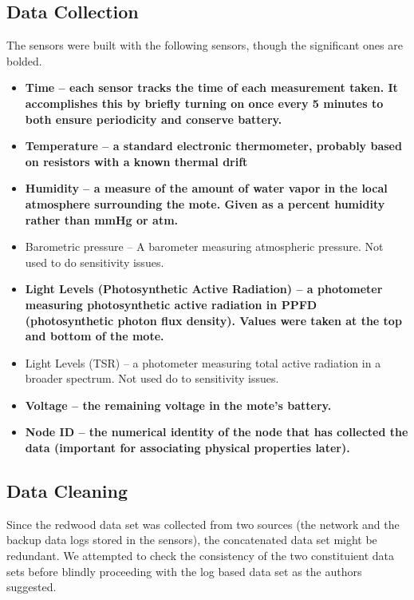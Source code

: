 \documentclass[english]{article}\usepackage[]{graphicx}\usepackage[]{color}
\begin{document}
\subsection{Data Collection}
The sensors were built with the following sensors, though the significant ones are bolded.
\begin{itemize}
\item \textbf{Time -- each sensor tracks the time of each measurement taken.  It accomplishes this by briefly turning on once every 5 minutes to both ensure periodicity and conserve battery.}
\item \textbf{Temperature -- a standard electronic thermometer, probably based on resistors with a known thermal drift}
\item \textbf{Humidity -- a measure of the amount of water vapor in the local atmosphere surrounding the mote.  Given as a percent humidity rather than mmHg or atm.}
\item Barometric pressure -- A barometer measuring atmospheric pressure.  Not used to do sensitivity issues.
\item \textbf{Light Levels (Photosynthetic Active Radiation) -- a photometer measuring photosynthetic active radiation in PPFD (photosynthetic photon flux density).  Values were taken at the top and bottom of the mote.}
\item Light Levels (TSR) -- a photometer measuring total active radiation in a broader spectrum.  Not used do to sensitivity issues.
\item \textbf{Voltage -- the remaining voltage in the mote's battery.}
\item \textbf{Node ID -- the numerical identity of the node that has collected the data (important for associating physical properties later).}
\end{itemize}

\subsection{Data Cleaning}

Since the redwood data set was collected from two sources (the network and the backup data logs stored in the sensors), the concatenated data set might be redundant. We attempted to check the consistency of the
two constituient data sets before blindly proceeding with the log based data set as the authors suggested.
\end{document}
